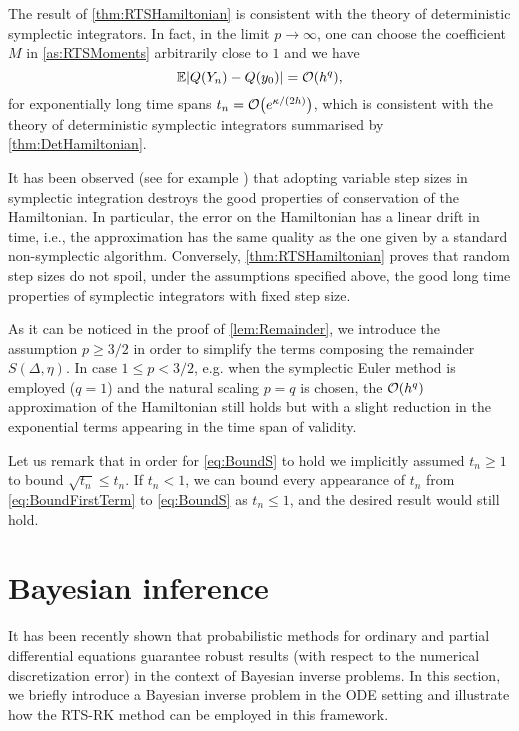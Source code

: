 \documentclass[10pt]{article}
\begin{document}
\begin{remark} The result of \cref{thm:RTSHamiltonian} is consistent with the theory of deterministic symplectic integrators. In fact, in the limit $p \to \infty$, one can choose the coefficient $M$ in \cref{as:RTSMoments} arbitrarily close to $1$ and we have 
	\begin{equation}
	\operatorname{\mathbb{E}} \lvert Q(Y_n) - Q(y_0)\rvert = \mathcal{O}(h^q),
	\end{equation}
	for exponentially long time spans $t_n = \mathcal{O}\big(e^{\kappa/(2h)}\big)$, which is consistent with the theory of deterministic symplectic integrators summarised by \cref{thm:DetHamiltonian}.
\end{remark}
\begin{remark} It has been observed (see for example \cite{Hai97, HLW06}) that adopting variable step sizes in symplectic integration destroys the good properties of conservation of the Hamiltonian. In particular, the error on the Hamiltonian has a linear drift in time, i.e., the approximation has the same quality as the one given by a standard non-symplectic algorithm. Conversely, \cref{thm:RTSHamiltonian} proves that random step sizes do not spoil, under the assumptions specified above, the good long time properties of symplectic integrators with fixed step size.
\end{remark}
\begin{remark} As it can be noticed in the proof of \cref{lem:Remainder}, we introduce the assumption $p \geq 3/2$ in order to simplify the terms composing the remainder $S(\Delta, \eta)$. In case $1 \leq p < 3/2$, e.g. when the symplectic Euler method is employed ($q = 1$) and the natural scaling $p = q$ is chosen, the $\mathcal{O}(h^q)$ approximation of the Hamiltonian still holds but with a slight reduction in the exponential terms appearing in the time span of validity.
\end{remark}
\begin{remark} Let us remark that in order for \eqref{eq:BoundS} to hold we implicitly assumed $t_n \geq 1$ to bound $\sqrt{t_n} \leq t_n$. If $t_n < 1$, we can bound every appearance of $t_n$ from \eqref{eq:BoundFirstTerm} to \eqref{eq:BoundS} as $t_n \leq 1$, and the desired result would still hold.
\end{remark}

\section{Bayesian inference}\label{sec:BayesianInference} It has been recently shown \cite{CGS17, CCC16, LST18} that probabilistic methods for ordinary and partial differential equations guarantee robust results (with respect to the numerical discretization error) in the context of Bayesian inverse problems. In this section, we briefly introduce a Bayesian inverse problem in the ODE setting and illustrate how the RTS-RK method can be employed in this framework. 
\end{document}
